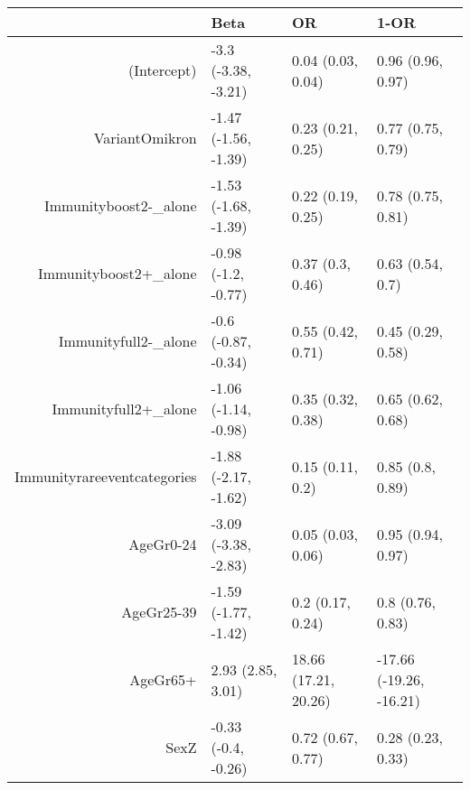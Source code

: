 \begin{table}[ht]
\centering
\begin{tabular}{rlll}
  \hline
 & Beta & OR & 1-OR \\ 
  \hline
(Intercept) & -3.3 (-3.38, -3.21) & 0.04 (0.03, 0.04) & 0.96 (0.96, 0.97) \\ 
  VariantOmikron & -1.47 (-1.56, -1.39) & 0.23 (0.21, 0.25) & 0.77 (0.75, 0.79) \\ 
  Immunityboost2-\_alone & -1.53 (-1.68, -1.39) & 0.22 (0.19, 0.25) & 0.78 (0.75, 0.81) \\ 
  Immunityboost2+\_alone & -0.98 (-1.2, -0.77) & 0.37 (0.3, 0.46) & 0.63 (0.54, 0.7) \\ 
  Immunityfull2-\_alone & -0.6 (-0.87, -0.34) & 0.55 (0.42, 0.71) & 0.45 (0.29, 0.58) \\ 
  Immunityfull2+\_alone & -1.06 (-1.14, -0.98) & 0.35 (0.32, 0.38) & 0.65 (0.62, 0.68) \\ 
  Immunityrareeventcategories & -1.88 (-2.17, -1.62) & 0.15 (0.11, 0.2) & 0.85 (0.8, 0.89) \\ 
  AgeGr0-24 & -3.09 (-3.38, -2.83) & 0.05 (0.03, 0.06) & 0.95 (0.94, 0.97) \\ 
  AgeGr25-39 & -1.59 (-1.77, -1.42) & 0.2 (0.17, 0.24) & 0.8 (0.76, 0.83) \\ 
  AgeGr65+ & 2.93 (2.85, 3.01) & 18.66 (17.21, 20.26) & -17.66 (-19.26, -16.21) \\ 
  SexZ & -0.33 (-0.4, -0.26) & 0.72 (0.67, 0.77) & 0.28 (0.23, 0.33) \\ 
   \hline
\end{tabular}
\end{table}
